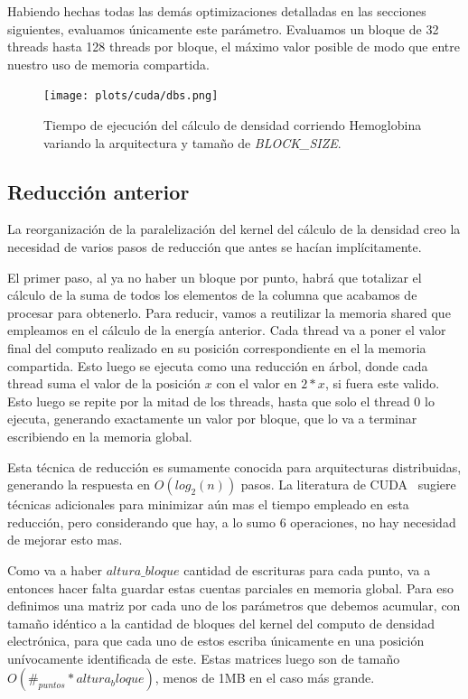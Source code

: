 Habiendo hechas todas las dem\'as optimizaciones detalladas en las secciones siguientes, evaluamos
\'unicamente este par\'ametro. Evaluamos un bloque de 32 threads hasta 128 threads por bloque,
el m\'aximo valor posible de modo que entre nuestro uso de memoria compartida.

\begin{figure}[htbp]
   \centering
   \texttt{[image: plots/cuda/dbs.png]}
   \caption{Tiempo de ejecuci\'on del c\'alculo de densidad corriendo Hemoglobina variando
   la arquitectura y tama\~no de \textit{BLOCK\_SIZE}.}
   \label{fig:dbs-runtime}
\end{figure}


\subsection{Reducci\'on anterior}
La reorganizaci\'on de la paralelizaci\'on del kernel del c\'alculo de la densidad creo la necesidad
de varios pasos de reducci\'on que antes se hac\'ian impl\'icitamente.

El primer paso, al ya no haber un bloque por punto, habr\'a que totalizar el c\'alculo de la
suma de todos los elementos de la columna que acabamos de procesar para obtenerlo. Para reducir,
vamos a reutilizar la memoria shared que empleamos en el c\'alculo de la energ\'ia anterior. Cada
thread va a poner el valor final del computo realizado en su posici\'on correspondiente en el
la memoria compartida. Esto luego se ejecuta como una reducci\'on en \'arbol, donde cada
thread suma el valor de la posici\'on $x$ con el valor en $2*x$, si fuera este valido. Esto
luego se repite por la mitad de los threads, hasta que solo el thread 0 lo ejecuta,
generando exactamente un valor por bloque, que lo va a terminar escribiendo en la memoria
global.

Esta t\'ecnica de reducci\'on es sumamente conocida para arquitecturas distribuidas, generando
la respuesta en $O(log_2(n))$ pasos. La literatura de CUDA~\cite{cudaReductions} sugiere t\'ecnicas adicionales para
minimizar a\'un mas el tiempo empleado en esta reducci\'on, pero considerando que hay, a lo sumo
6 operaciones, no hay necesidad de mejorar esto mas.

Como va a haber $altura\_bloque$ cantidad de escrituras para cada punto, va a entonces
hacer falta guardar estas cuentas parciales en memoria global. Para eso definimos una matriz
por cada uno de los par\'ametros que debemos acumular, con tama\~no id\'entico a la cantidad de bloques
del kernel del computo de densidad electr\'onica, para que cada uno de estos escriba \'unicamente en una posici\'on
un\'ivocamente identificada de este. Estas matrices luego son de tama\~no $O(\#_{puntos} * altura_bloque)$,
menos de 1MB en el caso m\'as grande.


